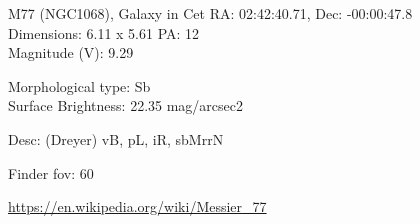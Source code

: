 \begin{block}{M77 (NGC1068), Galaxy in Cet}
    RA: 02:42:40.71, Dec: -00:00:47.8 \\ 
    Dimensions: 6.11 x 5.61 PA: 12 \\ 
    Magnitude (V): 9.29

    Morphological type: Sb \\ 
    Surface Brightness: 22.35 mag/arcsec2 

    Desc: (Dreyer) vB, pL, iR, sbMrrN 

    Finder fov: 60 

    \url{https://en.wikipedia.org/wiki/Messier_77} 
\end{block}